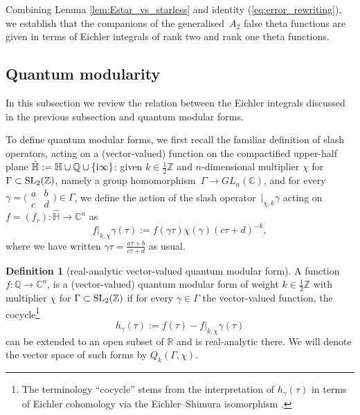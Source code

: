 \documentclass[10pt,a4paper]{amsart}
\def\BR{\mathbb{R}}
\def\BC{\mathbb{C}}
\def\BZ{\mathbb{Z}}
\theoremstyle{definition}
\newtheorem{defn}[thm]{Definition}
\numberwithin{equation}{section}
\begin{document}
Combining Lemma \ref{lem:Estar_vs_starless} and identity (\ref{eq:error_rewriting}), we establish that the companions of the generalised~$A_2$ false theta functions are given in terms of Eichler integrals of rank two and rank one theta functions.

\subsection{Quantum modularity}
\label{subsec:QM}

In this subsection we review the relation between the Eichler integrals discussed in the previous subsection and quantum modular forms.

To define quantum modular forms, we first recall the familiar definition of slash operators, acting on a (vector-valued) function on the compactified upper-half plane $\hat {\mathbb H} := \mathbb H\cup {\mathbb Q} \cup \{{\rm i}\infty\}$: given $k\in\frac{1}{2}\BZ$ and $n$-dimensional multiplier $\chi$ for $\Gamma\subset {\rm SL}_2(\mathbb Z)$, namely a group homomorphism~$\Gamma \to GL_n(\mathbb C)$, and for every $\gamma=\bigl(\begin{smallmatrix} a & b \\ c & d \end{smallmatrix}\bigr)\in\Gamma$, we define the action of the slash operator~$\lvert_{\chi,k}\gamma$ acting on $f=(f_r)\colon\hat {\mathbb H}\to \mathbb C^n$ as
\begin{equation*}
 f\lvert_{k,\chi}\gamma(\tau) := f(\gamma\tau)\chi(\gamma) (c\tau+d)^{-k},
\end{equation*}
where we have written $\gamma \tau = \frac{a\tau+b}{c\tau+d}$ as usual.

\begin{defn}[real-analytic vector-valued quantum modular form]\label{dfn:qmf}
A function $f\colon {\mathbb Q}\to\BC^n$, is a (vector-valued) quantum modular form of weight $k\in\frac{1}{2}\BZ$ with multiplier $\chi$ for $\Gamma \subset {\rm SL}_2(\BZ)$ if for every $\gamma\in\Gamma$ the vector-valued function, the cocycle\footnote{The terminology ``cocycle'' stems from the interpretation of $h_\gamma(\tau)$ in terms of Eichler cohomology via the Eichler--Shimura isomorphism \cite{Eichler1957, Shimura1959SurLI}.}
\[
	h_\gamma(\tau) := f(\tau) - f\lvert_{k,\chi}\gamma(\tau)
\]
can be extended to an open subset of $\BR$ and is real-analytic there. We will denote the vector space of such forms by ${Q}_k(\Gamma,\chi)$.
\end{defn}
\end{document}

